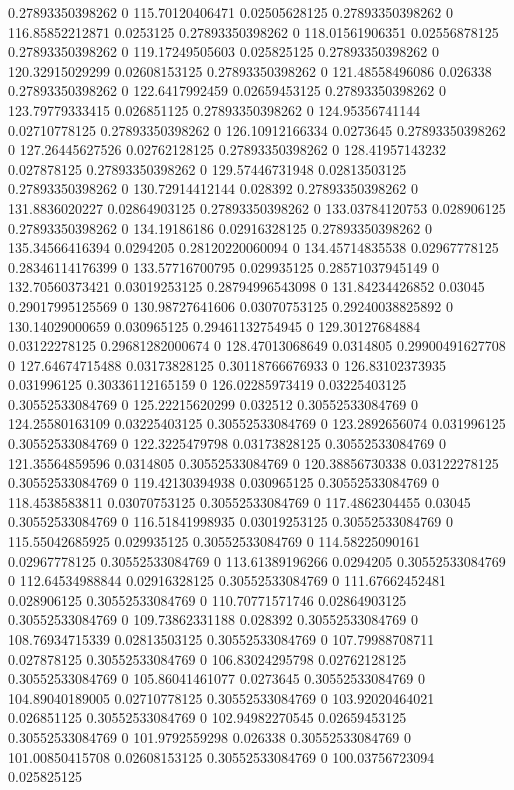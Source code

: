 0.27893350398262 0 115.70120406471 0.02505628125
0.27893350398262 0 116.85852212871 0.0253125
0.27893350398262 0 118.01561906351 0.02556878125
0.27893350398262 0 119.17249505603 0.025825125
0.27893350398262 0 120.32915029299 0.02608153125
0.27893350398262 0 121.48558496086 0.026338
0.27893350398262 0 122.6417992459 0.02659453125
0.27893350398262 0 123.79779333415 0.026851125
0.27893350398262 0 124.95356741144 0.02710778125
0.27893350398262 0 126.10912166334 0.0273645
0.27893350398262 0 127.26445627526 0.02762128125
0.27893350398262 0 128.41957143232 0.027878125
0.27893350398262 0 129.57446731948 0.02813503125
0.27893350398262 0 130.72914412144 0.028392
0.27893350398262 0 131.8836020227 0.02864903125
0.27893350398262 0 133.03784120753 0.028906125
0.27893350398262 0 134.19186186 0.02916328125
0.27893350398262 0 135.34566416394 0.0294205
0.28120220060094 0 134.45714835538 0.02967778125
0.28346114176399 0 133.57716700795 0.029935125
0.28571037945149 0 132.70560373421 0.03019253125
0.28794996543098 0 131.84234426852 0.03045
0.29017995125569 0 130.98727641606 0.03070753125
0.29240038825892 0 130.14029000659 0.030965125
0.29461132754945 0 129.30127684884 0.03122278125
0.29681282000674 0 128.47013068649 0.0314805
0.29900491627708 0 127.64674715488 0.03173828125
0.30118766676933 0 126.83102373935 0.031996125
0.30336112165159 0 126.02285973419 0.03225403125
0.30552533084769 0 125.22215620299 0.032512
0.30552533084769 0 124.25580163109 0.03225403125
0.30552533084769 0 123.2892656074 0.031996125
0.30552533084769 0 122.3225479798 0.03173828125
0.30552533084769 0 121.35564859596 0.0314805
0.30552533084769 0 120.38856730338 0.03122278125
0.30552533084769 0 119.42130394938 0.030965125
0.30552533084769 0 118.4538583811 0.03070753125
0.30552533084769 0 117.4862304455 0.03045
0.30552533084769 0 116.51841998935 0.03019253125
0.30552533084769 0 115.55042685925 0.029935125
0.30552533084769 0 114.58225090161 0.02967778125
0.30552533084769 0 113.61389196266 0.0294205
0.30552533084769 0 112.64534988844 0.02916328125
0.30552533084769 0 111.67662452481 0.028906125
0.30552533084769 0 110.70771571746 0.02864903125
0.30552533084769 0 109.73862331188 0.028392
0.30552533084769 0 108.76934715339 0.02813503125
0.30552533084769 0 107.79988708711 0.027878125
0.30552533084769 0 106.83024295798 0.02762128125
0.30552533084769 0 105.86041461077 0.0273645
0.30552533084769 0 104.89040189005 0.02710778125
0.30552533084769 0 103.92020464021 0.026851125
0.30552533084769 0 102.94982270545 0.02659453125
0.30552533084769 0 101.9792559298 0.026338
0.30552533084769 0 101.00850415708 0.02608153125
0.30552533084769 0 100.03756723094 0.025825125
